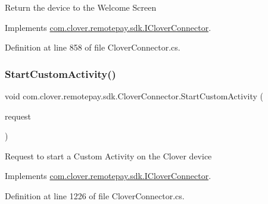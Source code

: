 Return the device to the Welcome Screen 



Implements \hyperlink{interfacecom_1_1clover_1_1remotepay_1_1sdk_1_1_i_clover_connector_a462fd3dbb5914ac1d5b906dd1daa57c0}{com.\+clover.\+remotepay.\+sdk.\+I\+Clover\+Connector}.



Definition at line 858 of file Clover\+Connector.\+cs.

\mbox{\label{classcom_1_1clover_1_1remotepay_1_1sdk_1_1_clover_connector_a7c4a08c49e7285e95d7e36340ebe3306}} 
\subsubsection{\texorpdfstring{Start\+Custom\+Activity()}{StartCustomActivity()}}
{\footnotesize\ttfamily void com.\+clover.\+remotepay.\+sdk.\+Clover\+Connector.\+Start\+Custom\+Activity (\begin{DoxyParamCaption}\item[{\hyperlink{classcom_1_1clover_1_1remotepay_1_1sdk_1_1_custom_activity_request}{Custom\+Activity\+Request}}]{request }\end{DoxyParamCaption})}



Request to start a Custom Activity on the Clover device 



Implements \hyperlink{interfacecom_1_1clover_1_1remotepay_1_1sdk_1_1_i_clover_connector_a3ec58f5860c34bcb104578caddb0b564}{com.\+clover.\+remotepay.\+sdk.\+I\+Clover\+Connector}.



Definition at line 1226 of file Clover\+Connector.\+cs.

\mbox{\label{classcom_1_1clover_1_1remotepay_1_1sdk_1_1_clover_connector_a84fa27d8c605594999b39e619b20359e}} 
